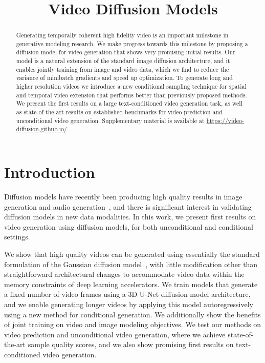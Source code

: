 \title{Video Diffusion Models}

\begin{abstract}
Generating temporally coherent high fidelity video is an important milestone in generative modeling research. We make progress towards this milestone by proposing a diffusion model for video generation that shows very promising initial results. Our model is a natural extension of the standard image diffusion architecture, and it enables jointly training from image and video data, which we find to reduce the variance of minibatch gradients and speed up optimization. To generate long and higher resolution videos we introduce a new conditional sampling technique for spatial and temporal video extension that performs better than previously proposed methods. We present the first results on a large text-conditioned video generation task, as well as state-of-the-art results on established benchmarks for video prediction and unconditional video generation. Supplementary material is available at \url{https://video-diffusion.github.io/}.
\end{abstract}

\section{Introduction}

Diffusion models have recently been producing high quality results in image generation and audio generation~\citep[e.g.][]{kingma2021variational,saharia2021palette,saharia2021image,dhariwal2021diffusion,ho2021cascaded,nichol2021glide,song2020score,whang2021deblurring,salimans2021progressive,chen2020wavegrad,kong2021diffwave}, and there is significant interest in validating diffusion models in new data modalities. In this work, we present first results on video generation using diffusion models, for both unconditional and conditional settings. 

We show that high quality videos can be generated using essentially the standard formulation of the Gaussian diffusion model~\citep{sohl2015deep}, with little modification other than straightforward architectural changes to accommodate video data within the memory constraints of deep learning accelerators. We train models that generate a fixed number of video frames using a 3D U-Net diffusion model architecture, and we enable generating longer videos by applying this model autoregressively using a new method for conditional generation. We additionally show the benefits of joint training on video and image modeling objectives. We test our methods on video prediction and unconditional video generation, where we achieve state-of-the-art sample quality scores, and we also show promising first results on text-conditioned video generation.

